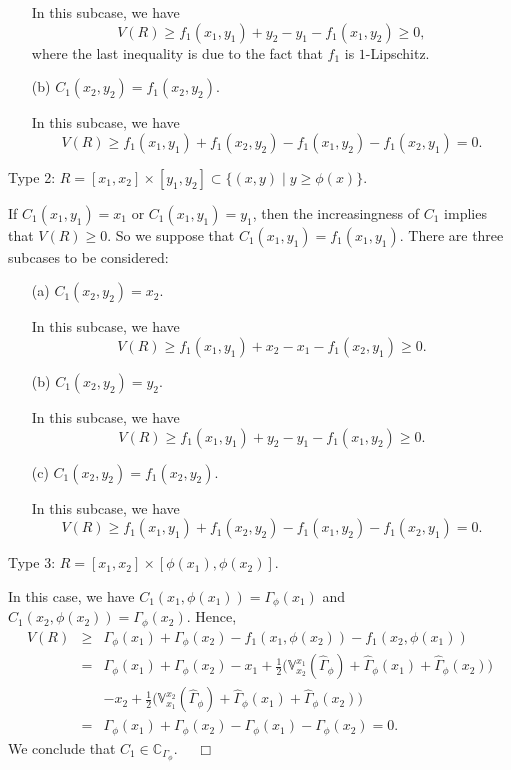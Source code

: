 \documentclass[10pt,a4paper]{amsart}
\renewenvironment{proof}{\noindent{\bf Proof.}}{~~$\Box$}
\begin{document}
\begin{proof}
\begin{itemize}
In this subcase, we have
\[
V(R)\geq f_1(x_1, y_1)+y_2-y_1-f_1(x_1, y_2)\geq 0,
\]
where the last inequality is due to the fact that $f_1$ is $1$-Lipschitz.

\item[\rm (b)] $C_1(x_2, y_2)=f_1(x_2, y_2)$.

In this subcase, we have
\[
V(R)\geq f_1(x_1, y_1)+f_1(x_2, y_2)-f_1(x_1, y_2)-f_1(x_2, y_1)=0.
\]
\end{itemize}

\noindent Type 2: $R=[x_1, x_2]\times[y_1, y_2]\subset\{(x, y)\mid y\geq\phi(x)\}$.

If $C_1(x_1, y_1)=x_1$ or $C_1(x_1, y_1)=y_1$, then the increasingness of $C_1$ implies that $V(R)\geq 0$. So we suppose that
$C_1(x_1, y_1)=f_1(x_1, y_1)$. There are three subcases to be considered:
\begin{itemize}%
\item[\rm (a)] $C_1(x_2, y_2)=x_2$.

In this subcase, we have
\[
V(R)\geq f_1(x_1, y_1)+x_2-x_1-f_1(x_2, y_1)\geq 0.
\]

\item[\rm (b)] $C_1(x_2, y_2)=y_2$.

In this subcase, we have
\[
V(R)\geq f_1(x_1, y_1)+y_2-y_1-f_1(x_1, y_2)\geq 0.
\]

\item[\rm (c)] $C_1(x_2, y_2)=f_1(x_2, y_2)$.

In this subcase, we have
\[
V(R)\geq f_1(x_1, y_1)+f_1(x_2, y_2)-f_1(x_1, y_2)-f_1(x_2, y_1)=0.
\]
\end{itemize}

\noindent Type 3: $R=[x_1, x_2]\times [\phi(x_1), \phi(x_2)]$.

In this case, we have $C_1(x_1, \phi(x_1))=\Gamma_\phi(x_1)$ and $C_1(x_2, \phi(x_2))=\Gamma_\phi(x_2)$. Hence,
\begin{eqnarray*}
V(R)&\geq& \Gamma_\phi(x_1)+\Gamma_\phi(x_2)-f_1(x_1, \phi(x_2))-f_1(x_2, \phi(x_1))\\
&=& \Gamma_\phi(x_1)+\Gamma_\phi(x_2)-x_1+\frac{1}{2}\Big(\mathbb{V}^{x_1}_{x_2}(\hat{\Gamma}_{\phi})+\hat{\Gamma}_{\phi}(x_1)+\hat{\Gamma}_{\phi}(x_2)\Big)\\
&&- x_2+ \frac{1}{2}\Big(\mathbb{V}^{x_2}_{x_1}(\hat{\Gamma}_{\phi})+\hat{\Gamma}_{\phi}(x_1)+\hat{\Gamma}_{\phi}(x_2)\Big)\\
&=& \Gamma_\phi(x_1)+\Gamma_\phi(x_2)-\Gamma_\phi(x_1)-\Gamma_\phi(x_2)=0.
\end{eqnarray*}
We conclude that $C_1\in \mathbb{C}_{\Gamma_\phi}$.
\end{proof}
\end{document}
